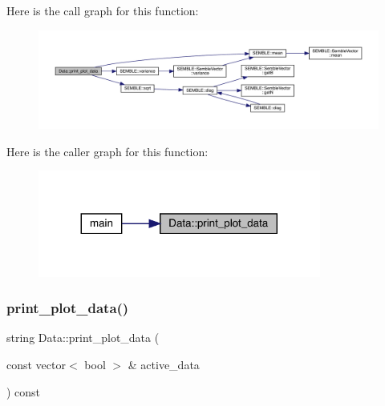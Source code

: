 Here is the call graph for this function\+:
\nopagebreak
\begin{figure}[H]
\begin{center}
\leavevmode
\includegraphics[width=350pt]{d0/df3/classData_a9dd9812c56754c985d50e9a5fc855320_cgraph}
\end{center}
\end{figure}
Here is the caller graph for this function\+:
\nopagebreak
\begin{figure}[H]
\begin{center}
\leavevmode
\includegraphics[width=263pt]{d0/df3/classData_a9dd9812c56754c985d50e9a5fc855320_icgraph}
\end{center}
\end{figure}
\mbox{\label{classData_a9dd9812c56754c985d50e9a5fc855320}} 
\subsubsection{\texorpdfstring{print\_plot\_data()}{print\_plot\_data()}\hspace{0.1cm}{\footnotesize\ttfamily [2/2]}}
{\footnotesize\ttfamily string Data\+::print\+\_\+plot\+\_\+data (\begin{DoxyParamCaption}\item[{const vector$<$ bool $>$ \&}]{active\+\_\+data }\end{DoxyParamCaption}) const}

\mbox{\label{classData_a8faffbd514fe8831470ce0e982c048da}} 
